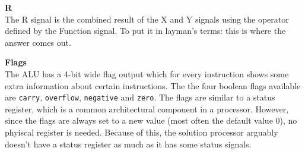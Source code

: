 \begin{description}
\item{\textbf{R}} \\
The R signal is the combined result of the X and Y signals using the operator defined by the Function signal.
To put it in layman's terms: this is where the answer comes out.

\item{\textbf{Flags}} \\
The ALU has a 4-bit wide flag output which for every instruction shows some extra information about certain instructions.
The the four boolean flags available are \texttt{carry}, \texttt{overflow}, \texttt{negative} and \texttt{zero}.
The flags are similar to a status register, which is a common architectural component in a processor.
However, since the flags are always set to a new value (most often the default value $ 0 $), no phyiscal register is needed.
Because of this, the solution processor arguably doesn't have a status register as much as it has some status signals.

\end{description}
